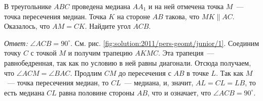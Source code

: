 В треугольнике $ABC$ проведена медиана $A A_1$ и на ней отмечена точка $M$~---
точка пересечения медиан.
Точка $K$ на стороне $AB$ такова, что $MK \parallel AC$.
Оказалось, что $AM = CK$.
Найдите угол $ACB$.

%
\label{solution:2011/pers-geomt/junior/1}%
\emph{Ответ:} $\angle ACB = 90^\circ$.
См. рис. \ref{fig:solution:2011/pers-geomt/junior/1}.
Соединим точку $C$ с точкой $M$ и получим трапецию $AKMC$.
Эта трапеция~--- равнобедренная, так как по условию в ней равны диагонали.
Отсюда получаем, что $\angle ACM = \angle BAC$.
Продлим $CM$ до пересечения с $AB$ в точке $L$.
Так как $M$~--- точка пересечения медиан, то $CL$~--- медиана, и, значит,
$AL = CL = LB$, то есть медиана $CL$ равна половине стороны $AB$, что и
означает, что $\angle ACB = 90^\circ$.

